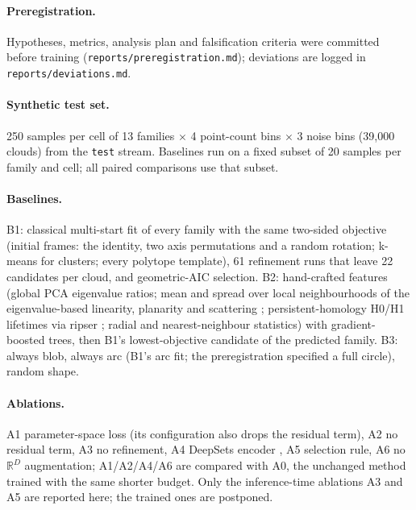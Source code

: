 \documentclass[10pt]{article}
\begin{document}
\paragraph{Preregistration.} Hypotheses, metrics, analysis plan and falsification criteria were committed before training (\texttt{reports/preregistration.md}); deviations are logged in \texttt{reports/deviations.md}.
\paragraph{Synthetic test set.} 250 samples per cell of 13 families $\times$ 4 point-count bins $\times$ 3 noise bins (39{,}000 clouds) from the \texttt{test} stream. Baselines run on a fixed subset of 20 samples per family and cell; all paired comparisons use that subset.
\paragraph{Baselines.} B1: classical multi-start fit of every family with the same two-sided objective (initial frames: the identity, two axis permutations and a random rotation; k-means for clusters; every polytope template), 61 refinement runs that leave 22 candidates per cloud, and geometric-AIC selection. B2: hand-crafted features (global PCA eigenvalue ratios; mean and spread over local neighbourhoods of the eigenvalue-based linearity, planarity and scattering \citep{weinmann2014features,weinmann2015features}; persistent-homology H0/H1 lifetimes via ripser \citep{tralie2018ripser}; radial and nearest-neighbour statistics) with gradient-boosted trees, then B1's lowest-objective candidate of the predicted family. B3: always blob, always arc (B1's arc fit; the preregistration specified a full circle), random shape.
\paragraph{Ablations.} A1 parameter-space loss (its configuration also drops the residual term), A2 no residual term, A3 no refinement, A4 DeepSets encoder \citep{zaheer2017deepsets}, A5 selection rule, A6 no $\mathbb{R}^D$ augmentation; A1/A2/A4/A6 are compared with A0, the unchanged method trained with the same shorter budget. Only the inference-time ablations A3 and A5 are reported here; the trained ones are postponed.
\end{document}
